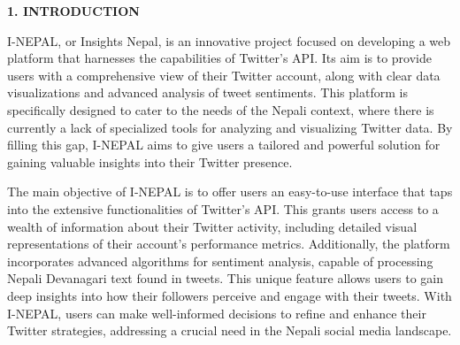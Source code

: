 \documentclass[a4paper,12pt]{article}
\begin{document}
{{{%
    





















  

      
								
		\begin{flushleft}
			\fontsize{14}{16}\selectfont\textbf{1. INTRODUCTION}
			\label{page1}
		\end{flushleft}
  I-NEPAL, or Insights Nepal, is an innovative project focused on developing a web platform that harnesses the capabilities of Twitter's API. Its aim is to provide users with a comprehensive view of their Twitter account, along with clear data visualizations and advanced analysis of tweet sentiments. This platform is specifically designed to cater to the needs of the Nepali context, where there is currently a lack of specialized tools for analyzing and visualizing Twitter data. By filling this gap, I-NEPAL aims to give users a tailored and powerful solution for gaining valuable insights into their Twitter presence.

The main objective of I-NEPAL is to offer users an easy-to-use interface that taps into the extensive functionalities of Twitter's API. This grants users access to a wealth of information about their Twitter activity, including detailed visual representations of their account's performance metrics. Additionally, the platform incorporates advanced algorithms for sentiment analysis, capable of processing Nepali Devanagari text found in tweets. This unique feature allows users to gain deep insights into how their followers perceive and engage with their tweets. With I-NEPAL, users can make well-informed decisions to refine and enhance their Twitter strategies, addressing a crucial need in the Nepali social media landscape.


								
		
		
}}}
\end{document}
